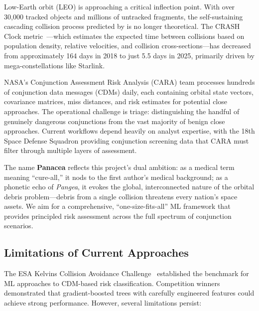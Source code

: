 \documentclass{article}
\begin{document}
Low-Earth orbit (LEO) is approaching a critical inflection point. With over 30,000 tracked objects and millions of untracked fragments, the self-sustaining cascading collision process predicted by \citet{kessler1978} is no longer theoretical. The CRASH Clock metric~\citep{thiele2025}---which estimates the expected time between collisions based on population density, relative velocities, and collision cross-sections---has decreased from approximately 164 days in 2018 to just 5.5 days in 2025, primarily driven by mega-constellations like Starlink.

NASA's Conjunction Assessment Risk Analysis (CARA) team processes hundreds of conjunction data messages (CDMs) daily, each containing orbital state vectors, covariance matrices, miss distances, and risk estimates for potential close approaches. The operational challenge is triage: distinguishing the handful of genuinely dangerous conjunctions from the vast majority of benign close approaches. Current workflows depend heavily on analyst expertise, with the 18th Space Defense Squadron providing conjunction screening data that CARA must filter through multiple layers of assessment.

The name \textbf{Panacea} reflects this project's dual ambition: as a medical term meaning ``cure-all,'' it nods to the first author's medical background; as a phonetic echo of \emph{Pangea}, it evokes the global, interconnected nature of the orbital debris problem---debris from a single collision threatens every nation's space assets. We aim for a comprehensive, ``one-size-fits-all'' ML framework that provides principled risk assessment across the full spectrum of conjunction scenarios.

\subsection{Limitations of Current Approaches}
\label{sec:limitations}

The ESA Kelvins Collision Avoidance Challenge~\citep{uriot2021} established the benchmark for ML approaches to CDM-based risk classification. Competition winners~\citep{stevenson2020,siew2020} demonstrated that gradient-boosted trees with carefully engineered features could achieve strong performance. However, several limitations persist:
\end{document}
